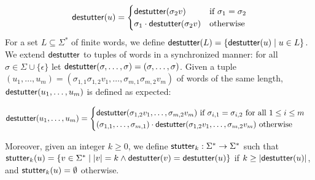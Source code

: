 \small
\begin{equation*}
	\mathsf{destutter}(u) =
	\begin{cases}
		\mathsf{destutter}(\sigma_2 v) & \text{if } \sigma_1 = \sigma_2 \\
		\sigma_1 \cdot \mathsf{destutter}(\sigma_2 v) & \text{otherwise}
	\end{cases}
\end{equation*}
\normalsize
For a set $L \subseteq \Sigma^*$ of finite words, we define $\destutter(L) = 
\{\destutter(u) \st u \in L\}$.
%
We extend $\mathsf{destutter}$ to tuples of words in a synchronized manner: for all $\sigma \in \Sigma \cup \{\epsilon\}$  let $\mathsf{destutter}(\sigma, \ldots, \sigma) = (\sigma, \ldots, \sigma)$.
Given a tuple $(u_1, \ldots, u_m) = (\sigma_{1,1} \sigma_{1,2} v_1, \ldots, \sigma_{m,1} \sigma_{m,2} v_m)$ of words of the same length, $\mathsf{destutter}(u_1, \ldots, u_m)$ is defined as expected:

\small
\begin{equation*}
	\mathsf{destutter}(u_1, \ldots, u_m) =
	\begin{cases}
		\mathsf{destutter}(\sigma_{1,2} v_1, \ldots, \sigma_{m,2} v_m) \text{ if $\sigma_{i,1} = \sigma_{i,2}$ for all $1 \leq i \leq m$} \\
		(\sigma_{1,1}, \ldots, \sigma_{m,1}) \cdot \mathsf{destutter}(\sigma_{1,2} v_1, \ldots, \sigma_{m,2} v_m) \text{ otherwise}
	\end{cases}
\end{equation*}
\normalsize

Moreover, given an integer $k \geq 0$, we define $\mathsf{stutter}_k : \Sigma^* \to \Sigma^*$ such that $\stutter_k(u) = \{v \in \Sigma^* \st |v| = k \land \destutter(v) = \destutter(u)\}$ if $k \geq |\mathsf{destutter}(u)|$, and $\mathsf{stutter}_k(u) = \emptyset$ otherwise.


